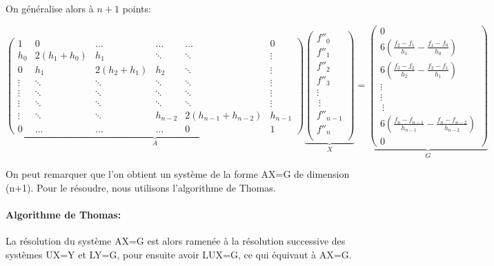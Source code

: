 \documentclass{article}
\begin{document}
\newpage
\begingroup\raggedleft
On g\'{e}n\'{e}ralise alors \`{a} $n+1$ points:
\endgroup
\begin{addmargin}[-5em]{-4em}
\[\underbrace{
	\begin{pmatrix}
   1 & 0 & \ldots& \ldots& \ldots& 0 \\
   h_0 & 2(h_1+h_0) & h_1 & \ddots& \ddots& \vdots \\
	0 & h_1 & 2(h_2+h_1) & h_2 & \ddots & \vdots \\
   \vdots & \ddots & \ddots & \ddots & \ddots& \vdots \\
   \vdots & \ddots & \ddots & \ddots & \ddots& \vdots \\
   \vdots & \ddots & \ddots & \ddots & \ddots& \vdots \\
   \vdots & \ddots &\ddots & h_{n-2} & 2(h_{n-1}+h_{n-2}) 		& h_{n-1}\\
   0 & \ldots& \ldots& \ldots& 0 & 1
 \end{pmatrix}
}_{A}
\underbrace{
\begin{pmatrix}
   f''_0 \\
   f''_1 \\
   f''_2 \\
   f''_3\\
   \vdots\\\
   \vdots\\
    f''_{n-1} \\
    f''_n \\
 \end{pmatrix}
}_{X}
=
\underbrace{
\begin{pmatrix}
  0\\
6(\frac{f_{2}-f_1}{h_1}-\frac{f_1-f_{0}}{h_{0}})\\
6(\frac{f_{3}-f_2}{h_2}-\frac{f_2-f_{1}}{h_{1}})\\
  \vdots\\
   \vdots\\\
   \vdots\\
6(\frac{f_{n}-f_{n-1}}{h_{n-1}}-\frac{f_n-f_{n-2}}{h_{n-2}})\\
0
 \end{pmatrix}
}_{G}\]
\end{addmargin}

\begingroup\raggedleft
On peut remarquer que l'on obtient un syst\`{e}me de la forme AX=G de dimension (n+1). Pour le r\'{e}soudre, nous utilisons l'algorithme de Thomas. 
\endgroup

\paragraph{Algorithme de Thomas:}
La r\'{e}solution du syst\`{e}me AX=G est alors ramen\'{e}e \`{a} la r\'{e}solution successive des syst\`{e}mes UX=Y et LY=G, pour ensuite avoir LUX=G, ce qui \'{e}quivaut \`a AX=G.
\end{document}
